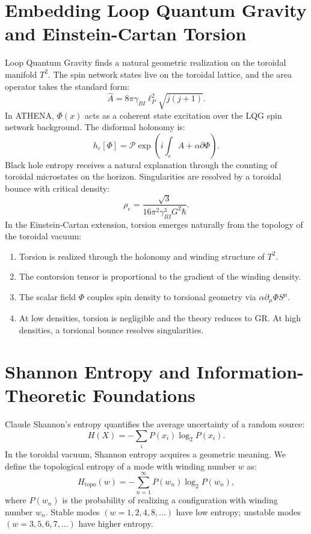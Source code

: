 \documentclass[11pt,a4paper]{article}
\begin{document}
\section{Embedding Loop Quantum Gravity and Einstein-Cartan Torsion}
Loop Quantum Gravity finds a natural geometric realization on the toroidal manifold \(T^2\). The spin network states live on the toroidal lattice, and the area operator takes the standard form:
\begin{equation}
\hat{A} = 8\pi \gamma_{BI}\ell_{P}^{2}\sqrt{j(j + 1)}. \tag{44}
\end{equation}
In ATHENA, \(\Phi (x)\) acts as a coherent state excitation over the LQG spin network background. The disformal holonomy is:
\begin{equation}
h_{e}[\Phi ] = \mathcal{P}\exp \left(i\int_{e}A + \alpha \partial \Phi\right). \tag{45}
\end{equation}
Black hole entropy receives a natural explanation through the counting of toroidal microstates on the horizon. Singularities are resolved by a toroidal bounce with critical density:
\begin{equation}
\rho_{e} = \frac{\sqrt{3}}{16\pi^{2}\gamma_{BI}^{3}G^{2}\hbar}. \tag{46}
\end{equation}
In the Einstein-Cartan extension, torsion emerges naturally from the topology of the toroidal vacuum:
\begin{enumerate}
\item Torsion is realized through the holonomy and winding structure of \(T^2\).
\item The contorsion tensor is proportional to the gradient of the winding density.
\item The scalar field \(\Phi\) couples spin density to torsional geometry via \(\alpha \partial_{\mu}\Phi S^{\mu}\).
\item At low densities, torsion is negligible and the theory reduces to GR. At high densities, a torsional bounce resolves singularities.
\end{enumerate}

\section{Shannon Entropy and Information-Theoretic Foundations}
Claude Shannon's entropy quantifies the average uncertainty of a random source:
\begin{equation}
H(X) = -\sum_{i}P(x_{i})\log_{2}P(x_{i}). \tag{47}
\end{equation}
In the toroidal vacuum, Shannon entropy acquires a geometric meaning. We define the topological entropy of a mode with winding number \(w\) as:
\begin{equation}
H_{\mathrm{topo}}(w) = -\sum_{n = 1}^{\infty}P(w_{n})\log_{2}P(w_{n}), \tag{48}
\end{equation}
where \(P(w_{n})\) is the probability of realizing a configuration with winding number \(w_{n}\). Stable modes \((w = 1,2,4,8,\ldots)\) have low entropy; unstable modes \((w = 3,5,6,7,\ldots)\) have higher entropy.
\end{document}
